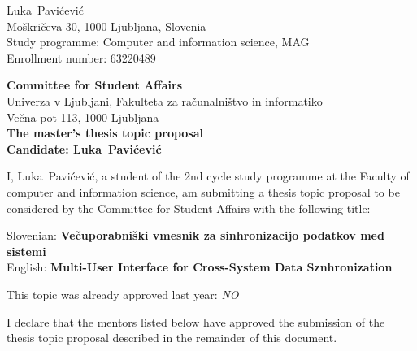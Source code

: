 \documentclass[a4paper, 12pt]{article}
\begin{document}
\newcommand{\ImeKandidata}{Luka} %
\newcommand{\PriimekKandidata}{Pavićević} %
\newcommand{\VpisnaStevilka}{63220489   } %
\newcommand{\StudyProgramme}{Computer and information science, MAG} %
\newcommand{\NaslovBivalisca}{ Moškričeva 30, 1000 Ljubljana, Slovenia } %
\newcommand{\SLONaslov}{Večuporabniški vmesnik za sinhronizacijo podatkov med sistemi} %
\newcommand{\ENGNaslov}{Multi-User Interface for Cross-System Data Sznhronization} %


\newcommand{\ProblemParagraph}{\noindent\textbf{Problem \& State of the Art.} }
\newcommand{\ContributionsParagraph}{\noindent\textbf{Expected Contributions / Technical outcome. } }
\newcommand{\MethodologyParagraph}{\noindent\textbf{Methodology \& Validation. } }

\newcommand{\Kandidat}{\ImeKandidata~\PriimekKandidata}
\noindent
\Kandidat\\
\NaslovBivalisca \\
Study programme: \StudyProgramme \\
Enrollment number: \VpisnaStevilka
\bigskip

{\bf Committee for Student Affairs}\\
Univerza v Ljubljani, Fakulteta za računalništvo in informatiko\\
Večna pot 113, 1000 Ljubljana\\

{\Large\bf
{\centering
    The master’s thesis topic proposal \\%
\large Candidate: \Kandidat \\[10mm]}}


I, \Kandidat, a student of the 2nd cycle study programme at the Faculty of computer and information science, am submitting a thesis topic proposal to be considered by the Committee for Student Affairs with the following title:

Slovenian: {\bf \SLONaslov}\\
English: {\bf \ENGNaslov}

This topic was already approved last year:  \textit{NO} 
 
I declare that the mentors listed below have approved the submission of the thesis topic proposal described in the remainder of this document.
\end{document}
